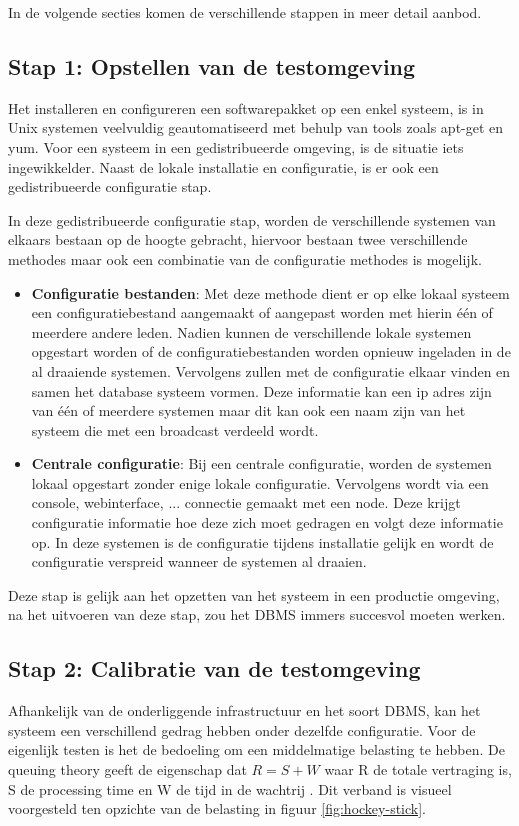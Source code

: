 In de volgende secties komen de verschillende stappen in meer detail aanbod.  

\subsection*{Stap 1: Opstellen van de testomgeving}
Het installeren en configureren een softwarepakket op een enkel systeem, is in Unix systemen veelvuldig geautomatiseerd met behulp van tools zoals \gls{apt-get} en \gls{yum}. Voor een systeem in een gedistribueerde omgeving, is de situatie iets ingewikkelder. Naast de lokale installatie en configuratie, is er ook een gedistribueerde configuratie stap.  

In deze gedistribueerde configuratie stap, worden de verschillende systemen van elkaars bestaan op de hoogte gebracht, hiervoor bestaan twee verschillende methodes maar ook een combinatie van de configuratie methodes is mogelijk.
 
\begin{itemize}
\item \textbf{Configuratie bestanden}: Met deze methode dient er op elke lokaal systeem een configuratiebestand aangemaakt of aangepast worden met hierin één of meerdere andere leden. Nadien kunnen de verschillende lokale systemen opgestart worden of de configuratiebestanden worden opnieuw ingeladen in de al draaiende systemen. Vervolgens zullen met de configuratie elkaar vinden en samen het database systeem vormen. Deze informatie kan een ip adres zijn van één of meerdere systemen maar dit kan ook een naam zijn van het systeem die met een broadcast verdeeld wordt. 
\item \textbf{Centrale configuratie}: Bij een centrale configuratie, worden de systemen lokaal opgestart zonder enige lokale configuratie. Vervolgens wordt via een console, webinterface, ... connectie gemaakt met een node. Deze krijgt configuratie informatie hoe deze zich moet gedragen en volgt deze informatie op. In deze systemen is de configuratie tijdens installatie gelijk en wordt de configuratie verspreid wanneer de systemen al draaien.  
\end{itemize}

Deze stap is gelijk aan het opzetten van het systeem in een productie omgeving, na het uitvoeren van deze stap, zou het DBMS immers succesvol moeten werken. 

\subsection*{Stap 2: Calibratie van de testomgeving}
Afhankelijk van de onderliggende infrastructuur en het soort DBMS, kan het systeem een verschillend gedrag hebben onder dezelfde configuratie. Voor de eigenlijk testen is het de bedoeling om een middelmatige belasting te hebben. De queuing theory geeft de eigenschap dat $R = S + W$ waar R de totale vertraging is, S de processing time en W de tijd in de wachtrij \cite{millsap2003optimizing}. Dit verband is visueel voorgesteld ten opzichte van de belasting in figuur \ref{fig:hockey-stick}. 

